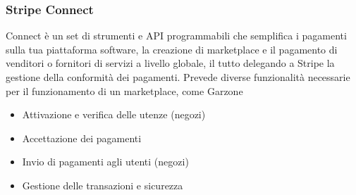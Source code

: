 \subsubsection{Stripe Connect}
Connect è un set di strumenti e API programmabili che semplifica i pagamenti sulla tua piattaforma software, la creazione di marketplace e il pagamento di venditori o fornitori di servizi a livello globale, il tutto delegando a Stripe la gestione della conformità dei pagamenti\cite{STRIPE}. Prevede diverse funzionalità necessarie per il funzionamento di un marketplace, come Garzone
\begin{itemize}
  \item Attivazione e verifica delle utenze (negozi)
  \item Accettazione dei pagamenti
  \item Invio di pagamenti agli utenti (negozi)
  \item Gestione delle transazioni e sicurezza
\end{itemize}